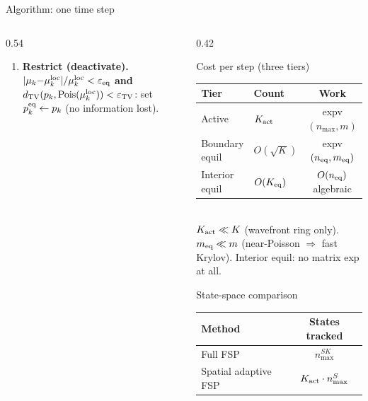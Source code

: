 \documentclass[10pt,aspectratio=169]{beamer}
\newcommand{\Pois}{\operatorname{Pois}}
\begin{document}
\begin{frame}[shrink=4]{Algorithm: one time step}
\begin{columns}[T]
\begin{column}{0.54\textwidth}
\begin{enumerate}
      \item \textbf{Restrict (deactivate).}
            $|\mu_k {-} \mu_k^{\rm loc}|/\mu_k^{\rm loc} < \varepsilon_{\rm eq}$
            \textbf{and} $d_{\rm TV}(p_k,\Pois(\mu_k^{\rm loc})) < \varepsilon_{\rm TV}$:
            set $p_k^{\rm eq} \leftarrow p_k$ (no information lost).
    \end{enumerate}
  \end{column}
  \begin{column}{0.42\textwidth}
    \begin{block}{Cost per step (three tiers)}
      \vspace{0.1em}
      \begin{tabular}{@{}llc@{}}
        \toprule
        Tier & Count & Work \\
        \midrule
        Active & $K_{\rm act}$ & expv$(n_{\max},m)$ \\
        Boundary equil & $O(\sqrt{K})$ & expv$(n_{\rm eq},m_{\rm eq})$ \\
        Interior equil & $O(K_{\rm eq})$ & $O(n_{\rm eq})$ algebraic \\
        \bottomrule
      \end{tabular}\\[0.3em]
      {\scriptsize
        $K_{\rm act} \ll K$ (wavefront ring only).
        $m_{\rm eq} \ll m$ (near-Poisson $\Rightarrow$ fast Krylov).
        Interior equil: no matrix exp at all.
      }
    \end{block}

    \vspace{0.3em}
    \begin{block}{State-space comparison}
      \vspace{0.1em}
      \begin{tabular}{@{}lc@{}}
        \toprule
        Method & States tracked \\
        \midrule
        Full FSP & $n_{\max}^{SK}$ \\
        Spatial adaptive FSP & $K_{\rm act} \cdot n_{\max}^{S}$ \\
        \bottomrule
      \end{tabular}
    \end{block}
  \end{column}
\end{columns}

\end{frame}
\end{document}
